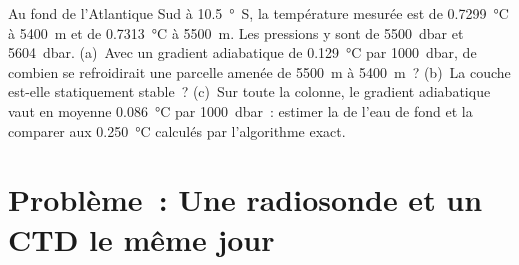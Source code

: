\begin{exercise}[$\star\star\star$]\label{exo:b1:fluid-envelopes-structure:12}
Au fond de l'Atlantique Sud à \qty{10.5}{\degree S}, la température mesurée
est de \qty{0.7299}{\celsius} à \qty{5400}{m} et de \qty{0.7313}{\celsius}
à \qty{5500}{m}. Les pressions y sont de \qty{5500}{dbar} et \qty{5604}{dbar}. (a)~Avec un
gradient adiabatique de \qty{0.129}{\celsius} par \qty{1000}{dbar}, de combien
se refroidirait une parcelle amenée de \qty{5500}{m} à \qty{5400}{m}~? (b)~La couche est-elle
statiquement stable~? (c)~Sur toute la colonne, le gradient adiabatique vaut en moyenne
\qty{0.086}{\celsius} par \qty{1000}{dbar}~: estimer la 
de l'eau de fond et la comparer aux \qty{0.250}{\celsius} calculés par l'algorithme
exact.
\end{exercise}

\section{Problème~: Une radiosonde et un CTD le même jour}

